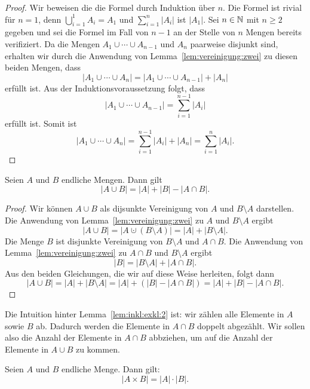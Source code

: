 \begin{proof} 
	Wir beweisen die die Formel durch Induktion über $n$. 
	Die Formel ist rivial für $n=1$, denn $\bigcup_{i=1}^1 A_i = A_1$ und $\sum_{i=1}^n |A_i|$ ist $|A_1|$. 
	Sei $n \in \mathbb{N}$ mit $n \ge 2$ gegeben und sei die Formel im Fall von $n-1$ an der Stelle von $n$ Mengen bereits verifiziert. Da die Mengen $A_1 \cup \cdots \cup A_{n-1}$ und $A_n$ paarweise disjunkt sind, erhalten wir durch die Anwendung von Lemma~\ref{lem:vereinigung:zwei} zu diesen beiden Mengen, dass 
	\[
		| A_1 \cup \cdots \cup A_n| = |A_1 \cup \cdots \cup A_{n-1} | + |A_n| 
	\]
	erfüllt ist. Aus der Induktionsvoraussetzung folgt, dass 
	\[
		| A_1 \cup \cdots \cup A_{n-1} | = \sum_{i=1}^{n-1} |A_i|
	\]
	erfüllt ist. Somit ist 
	\[
		| A_1 \cup \cdots \cup A_n| = \sum_{i=1}^{n-1} |A_i|  + |A_n| = \sum_{i=1}^n |A_i|. 
	\]
\end{proof} 

\begin{lem} \label{lem:inkl:exkl:2}
	Seien $A$ und $B$ endliche Mengen. Dann gilt 
	\[
		|A \cup B| = |A| + |B| - |A \cap B|. 
	\]
\end{lem}

\begin{proof}
		Wir können $A \cup B$ als dijsunkte Vereinigung von $A$ und $B \setminus A$ darstellen. Die Anwendung von Lemma~\ref{lem:vereinigung:zwei} zu $A$ und $B \setminus A$ ergibt 
		\[
			| A \cup B| = |A \cupdot (B \setminus A)| = |A | + |B \setminus A|. 
		\]
		Die Menge $B$ ist disjunkte Vereinigung von $B \setminus A$ und $A \cap B$. Die Anwendung von Lemma~\ref{lem:vereinigung:zwei} zu $A \cap B$ und $B \setminus A$ ergibt
		\[
			|B| = |B \setminus A| + |A \cap B|. 
		\]
		Aus den beiden Gleichungen, die wir auf diese Weise herleiten, folgt dann 
		\[
			| A \cup B|  = |A | + |B \setminus A| = |A| + (|B| - | A \cap B|) = |A| + |B| - | A \cap B|. 
		\]
\end{proof} 

\begin{bem}
	Die Intuition hinter Lemma~\ref{lem:inkl:exkl:2} ist: wir zählen alle Elemente in $A$ sowie $B$ ab. Dadurch werden die Elemente in $A \cap B$ doppelt abgezählt. Wir sollen also die Anzahl der Elemente in $A \cap B$ abbziehen, um auf die Anzahl der Elemente in $A \cup B$ zu kommen. 
\end{bem} 

\begin{lem}
	Seien $A$ und $B$ endliche Menge. Dann gilt: 
	\[
		|A \times B| = |A| \cdot |B|. 
	\]
\end{lem}
 

